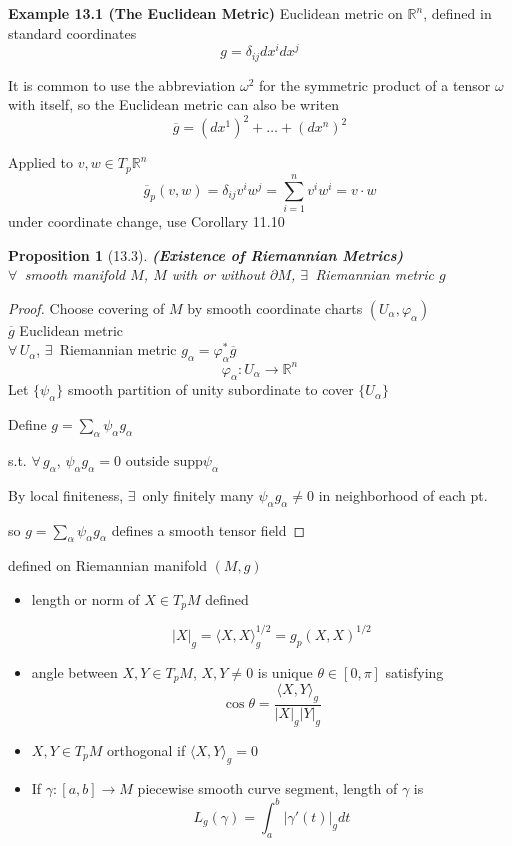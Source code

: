 \documentclass[11pt]{amsart}
\newtheorem{proposition}{Proposition}
\theoremstyle{definition}
\begin{document}
\textbf{Example 13.1 (The Euclidean Metric)}  Euclidean metric on $\mathbb{R}^n$, defined in standard coordinates
\[
g = \delta_{ij} dx^i dx^j
\]

It is common to use the abbreviation $\omega^2$ for the symmetric product of a tensor $\omega$ with itself, so the Euclidean metric can also be writen
\[
\overline{g} = (dx^1)^2 + \dots + (dx^n)^2
\]

Applied to $v,w \in T_p\mathbb{R}^n$
\[
\overline{g}_p(v,w) = \delta_{ij} v^i w^j = \sum_{i=1}^n v^i w^i = v\cdot w
\]
under coordinate change, use Corollary 11.10

\begin{proposition}[13.3] \textbf{(Existence of Riemannian Metrics)} \\
                          $\forall \, $ smooth manifold $M$, $M$ with or without $\partial M$, $\exists \, $ Riemannian metric $g$
\end{proposition}

\begin{proof}
Choose covering of $M$ by smooth coordinate charts $(U_{\alpha}, \varphi_{\alpha})$ \\
$\overline{g}$ Euclidean metric \\
$\forall \, U_{\alpha}$, $\exists \, $ Riemannian metric $g_{\alpha} = \varphi_{\alpha}^* \overline{g}$
\[
\varphi_{\alpha} : U_{\alpha} \to \mathbb{R}^n
\]
Let $\lbrace \psi_{\alpha} \rbrace$ smooth partition of unity subordinate to cover $\lbrace U_{\alpha} \rbrace$

Define $g= \sum_{\alpha} \psi_{\alpha} g_{\alpha}$

s.t. $\forall \, g_{\alpha}$, $\psi_{\alpha} g_{\alpha} = 0$ outside $\text{supp}{\psi_{\alpha}}$

By local finiteness, $\exists \, $ only finitely many $\psi_{\alpha} g_{\alpha} \neq 0$ in neighborhood of each pt.

so $g= \sum_{\alpha} \psi_{\alpha} g_{\alpha}$ defines a smooth tensor field


\end{proof}


defined on Riemannian manifold $(M,g)$

\begin{itemize}
  \item length or norm of $X \in T_pM$ defined

\[
|X|_g = \langle X, X \rangle_g^{1/2} = g_p(X,X)^{1/2}
\]
\item angle between $X,Y \in T_pM$, $X,Y \neq 0$ is unique $\theta \in [0,\pi]$ satisfying
\[
\cos{\theta} = \frac{ \langle X,Y \rangle_g }{ |X|_g |Y|_g}
\]
\item $X,Y \in T_pM$ orthogonal if $\langle X,Y\rangle_g = 0$
\item If $\gamma:[a,b] \to M$ piecewise smooth curve segment, length of $\gamma$ is
\[
L_g(\gamma) = \int_a^b |\gamma'(t)|_g dt
\]
\end{itemize}
\end{document}
